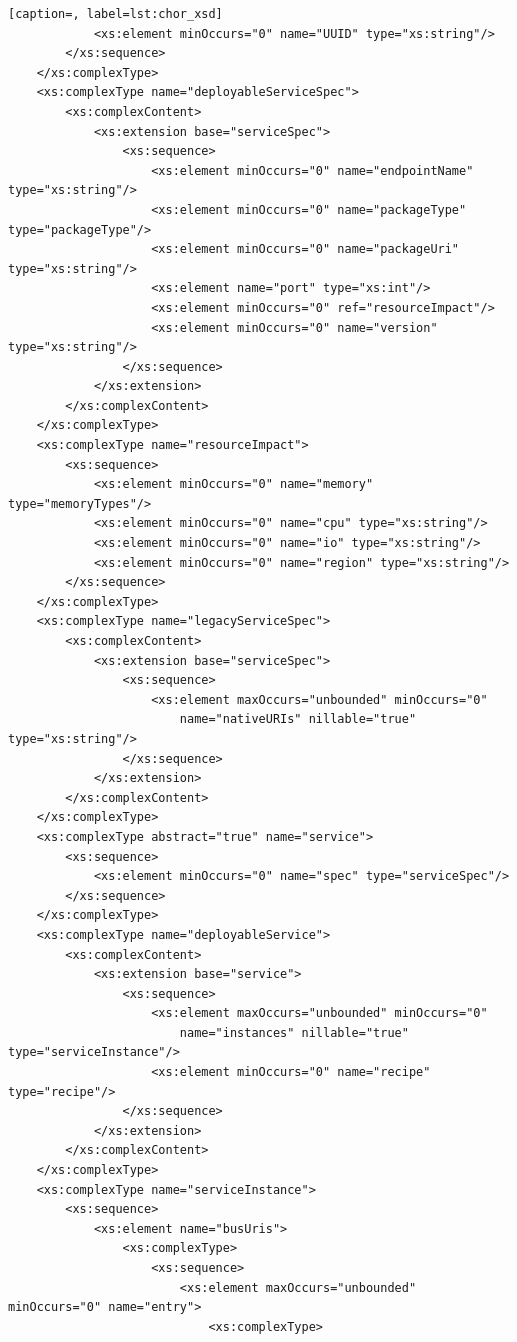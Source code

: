 \documentclass[a4paper, 10pt]{article}
\begin{document}
{\begin{lstlisting}[caption=, label=lst:chor_xsd]
            <xs:element minOccurs="0" name="UUID" type="xs:string"/>
        </xs:sequence>
    </xs:complexType>
    <xs:complexType name="deployableServiceSpec">
        <xs:complexContent>
            <xs:extension base="serviceSpec">
                <xs:sequence>
                    <xs:element minOccurs="0" name="endpointName" type="xs:string"/>
                    <xs:element minOccurs="0" name="packageType" type="packageType"/>
                    <xs:element minOccurs="0" name="packageUri" type="xs:string"/>
                    <xs:element name="port" type="xs:int"/>
                    <xs:element minOccurs="0" ref="resourceImpact"/>
                    <xs:element minOccurs="0" name="version" type="xs:string"/>
                </xs:sequence>
            </xs:extension>
        </xs:complexContent>
    </xs:complexType>
    <xs:complexType name="resourceImpact">
        <xs:sequence>
            <xs:element minOccurs="0" name="memory" type="memoryTypes"/>
            <xs:element minOccurs="0" name="cpu" type="xs:string"/>
            <xs:element minOccurs="0" name="io" type="xs:string"/>
            <xs:element minOccurs="0" name="region" type="xs:string"/>
        </xs:sequence>
    </xs:complexType>
    <xs:complexType name="legacyServiceSpec">
        <xs:complexContent>
            <xs:extension base="serviceSpec">
                <xs:sequence>
                    <xs:element maxOccurs="unbounded" minOccurs="0"
                        name="nativeURIs" nillable="true" type="xs:string"/>
                </xs:sequence>
            </xs:extension>
        </xs:complexContent>
    </xs:complexType>
    <xs:complexType abstract="true" name="service">
        <xs:sequence>
            <xs:element minOccurs="0" name="spec" type="serviceSpec"/>
        </xs:sequence>
    </xs:complexType>
    <xs:complexType name="deployableService">
        <xs:complexContent>
            <xs:extension base="service">
                <xs:sequence>
                    <xs:element maxOccurs="unbounded" minOccurs="0"
                        name="instances" nillable="true" type="serviceInstance"/>
                    <xs:element minOccurs="0" name="recipe" type="recipe"/>
                </xs:sequence>
            </xs:extension>
        </xs:complexContent>
    </xs:complexType>
    <xs:complexType name="serviceInstance">
        <xs:sequence>
            <xs:element name="busUris">
                <xs:complexType>
                    <xs:sequence>
                        <xs:element maxOccurs="unbounded" minOccurs="0" name="entry">
                            <xs:complexType>

\end{lstlisting}}
\end{document}
